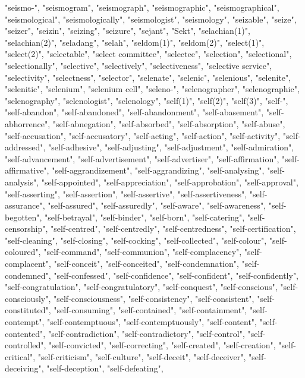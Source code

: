 "seismo-",
"seismogram",
"seismograph",
"seismographic",
"seismographical",
"seismological",
"seismologically",
"seismologist",
"seismology",
"seizable",
"seize",
"seizer",
"seizin",
"seizing",
"seizure",
"sejant",
"Sekt",
"selachian(1)",
"selachian(2)",
"seladang",
"selah",
"seldom(1)",
"seldom(2)",
"select(1)",
"select(2)",
"selectable",
"select committee",
"selectee",
"selection",
"selectional",
"selectionally",
"selective",
"selectively",
"selectiveness",
"selective service",
"selectivity",
"selectness",
"selector",
"selenate",
"selenic",
"selenious",
"selenite",
"selenitic",
"selenium",
"selenium cell",
"seleno-",
"selenographer",
"selenographic",
"selenography",
"selenologist",
"selenology",
"self(1)",
"self(2)",
"self(3)",
"self-",
"self-abandon",
"self-abandoned",
"self-abandonment",
"self-abasement",
"self-abhorrence",
"self-abnegation",
"self-absorbed",
"self-absorption",
"self-abuse",
"self-accusation",
"self-accusatory",
"self-acting",
"self-action",
"self-activity",
"self-addressed",
"self-adhesive",
"self-adjusting",
"self-adjustment",
"self-admiration",
"self-advancement",
"self-advertisement",
"self-advertiser",
"self-affirmation",
"self-affirmative",
"self-aggrandizement",
"self-aggrandizing",
"self-analysing",
"self-analysis",
"self-appointed",
"self-appreciation",
"self-approbation",
"self-approval",
"self-asserting",
"self-assertion",
"self-assertive",
"self-assertiveness",
"self-assurance",
"self-assured",
"self-assuredly",
"self-aware",
"self-awareness",
"self-begotten",
"self-betrayal",
"self-binder",
"self-born",
"self-catering",
"self-censorship",
"self-centred",
"self-centredly",
"self-centredness",
"self-certification",
"self-cleaning",
"self-closing",
"self-cocking",
"self-collected",
"self-colour",
"self-coloured",
"self-command",
"self-communion",
"self-complacency",
"self-complacent",
"self-conceit",
"self-conceited",
"self-condemnation",
"self-condemned",
"self-confessed",
"self-confidence",
"self-confident",
"self-confidently",
"self-congratulation",
"self-congratulatory",
"self-conquest",
"self-conscious",
"self-consciously",
"self-consciousness",
"self-consistency",
"self-consistent",
"self-constituted",
"self-consuming",
"self-contained",
"self-containment",
"self-contempt",
"self-contemptuous",
"self-contemptuously",
"self-content",
"self-contented",
"self-contradiction",
"self-contradictory",
"self-control",
"self-controlled",
"self-convicted",
"self-correcting",
"self-created",
"self-creation",
"self-critical",
"self-criticism",
"self-culture",
"self-deceit",
"self-deceiver",
"self-deceiving",
"self-deception",
"self-defeating",
